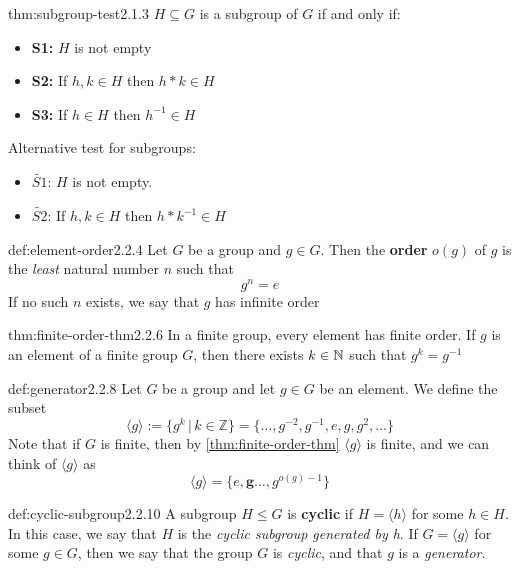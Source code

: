 \documentclass[8pt]{extarticle}
\begin{document}
\begin{multicols}{2}
\begin{thm}{thm:subgroup-test}{2.1.3}
    $H\subseteq G$ is a subgroup of $G$ if and only if:
    \renewcommand\labelitemi{\tiny$\bullet$}
    \begin{itemize}
        \setlength\itemsep{0em}
        \item \textbf{S1:} $H$ is not empty
        \item \textbf{S2:} If $h,k\in H$ then $h\ast k\in H$
        \item \textbf{S3:} If $h\in H$ then $h^{-1}\in H$
    \end{itemize}
    Alternative test for subgroups:
    \renewcommand\labelitemi{\tiny$\bullet$}
    \begin{itemize}
        \setlength\itemsep{0em}
        \item $\widetilde{S1}$: $H$ is not empty.
        \item $\widetilde{S2}$: If $h,k\in H$ then $h*k^{-1}\in H$
    \end{itemize}
\end{thm}

\begin{dfn}{def:element-order}{2.2.4}
    Let $G$ be a group and $g\in G$. Then the \textbf{order} $o(g)$ of $g$ is the \textit{least} natural number $n$ such that
    $$g^n = e$$
    If no such $n$ exists, we say that $g$ has infinite order
\end{dfn}

\begin{thm}{thm:finite-order-thm}{2.2.6}
    In a finite group, every element has finite order.\newline
    If $g$ is an element of a finite group $G$, then there exists $k\in \mathbb{N}$ such that $g^{k} = g^{-1}$
\end{thm}

\begin{dfn}{def:generator}{2.2.8}
    Let $G$ be a group and let $g\in G$ be an element. We define the subset
    $$\langle g \rangle := \{g^k \,|\,k\in\mathbb{Z}\} = \{\dots,g^{-2}, g^{-1},e,g,g^{2},\dots  \}$$
    Note that if $G$ is finite, then by \ref{thm:finite-order-thm} $\langle g \rangle$ is finite, and we can think of $\langle g \rangle$ as
    $$\langle g \rangle = \{e,\mathbf{g}\dots,g^{o(g)-1}\}$$
\end{dfn}

\begin{dfn}{def:cyclic-subgroup}{2.2.10}
    A subgroup $H\le G$ is \textbf{cyclic} if $H = \langle h \rangle$ for some $h\in H$. In this case, we say that $H$ is the \textit{cyclic subgroup generated by h}. If $G=\langle g \rangle$ for some $g\in G$, then we say that the group $G$ is \textit{cyclic}, and that $g$ is a \textit{generator}.
\end{dfn}


\end{multicols}
\end{document}
